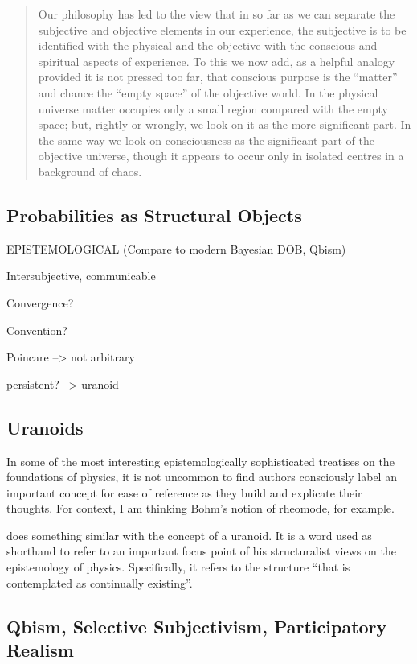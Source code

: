 \documentclass{article}
\begin{document}
\begin{quote}
    Our philosophy has led to the view that in so far as we can separate the subjective and objective elements in our experience, the subjective is to be identified with the physical and the objective with the conscious and spiritual aspects of experience.  To this we now add, as a helpful analogy provided it is not pressed too far, that conscious purpose is the ``matter'' and chance the ``empty space'' of the objective world.  In the physical universe matter occupies only a small region compared with the empty space; but, rightly or wrongly, we look on it as the more significant part.  In the same way we look on consciousness as the significant part of the objective universe, though it appears to occur only in isolated centres in a background of chaos.  \citep[p. 180-184]{Eddington1939}
\end{quote}

\subsection{Probabilities as Structural Objects}

EPISTEMOLOGICAL (Compare to modern Bayesian DOB, Qbism)

Intersubjective, communicable

Convergence?

Convention?

Poincare --> not arbitrary

persistent?  --> uranoid

\subsection{Uranoids}

In some of the most interesting epistemologically sophisticated treatises on the foundations of physics, it is not uncommon to find authors consciously label an important concept for ease of reference as they build and explicate their thoughts.  For context, I am thinking Bohm's notion of rheomode, for example.

\cite{Eddington1939} does something similar with the concept of a uranoid.  It is a word used as shorthand to refer to an important focus point of his structuralist views on the epistemology of physics.  Specifically, it refers to the structure ``that is contemplated as continually existing''.  \citep[p. 166]{Eddington1939}

\subsection{Qbism, Selective Subjectivism, Participatory Realism}
\end{document}
